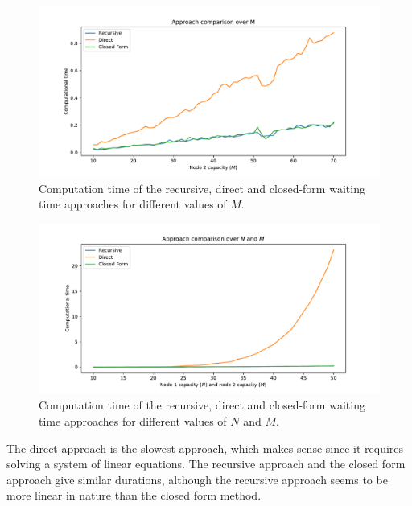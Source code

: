 \begin{figure}[H]
    \includegraphics[width=\textwidth]{chapters/03_queueing_model/Bin/numeric_results_and_timings/waiting_time_formulas_comparison/algorithm_duration_over_M.pdf}
    \caption{Computation time of the recursive, direct and closed-form waiting
    time approaches for different values of \(M\).}
    \label{fig:waiting_time_algorithm_duration_over_M}
\end{figure}


\begin{figure}[H]
    \includegraphics[width=\textwidth]{chapters/03_queueing_model/Bin/numeric_results_and_timings/waiting_time_formulas_comparison/algorithm_duration_over_N_and_M.pdf}
    \caption{Computation time of the recursive, direct and closed-form waiting
    time approaches for different values of \(N\) and \(M\).}
    \label{fig:waiting_time_algorithm_duration_over_N_and_M}
\end{figure}

The direct approach is the slowest approach, which makes sense since it requires
solving a system of linear equations.
The recursive approach and the closed form approach give similar durations,
although the recursive approach seems to be more linear in nature than the
closed form method.


